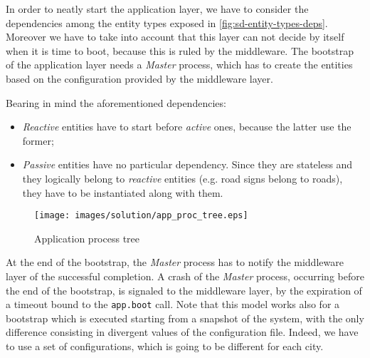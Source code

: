 In order to neatly start the application layer, we have to consider the 
dependencies among the entity types exposed in \ref{fig:sd-entity-types-deps}. 
Moreover we have to take into account that this layer can not decide by itself 
when it is time to boot, because this is ruled by the middleware.
The bootstrap of the application layer needs a \textit{Master} process,
which has to create the entities based on the configuration provided by 
the middleware layer.

Bearing in mind the aforementioned dependencies:
\begin{itemize}
  \item \textit{Reactive} entities have to start before \textit{active} 
ones, because the latter use the former; 
  \item \textit{Passive} entities have no particular dependency. Since 
they are stateless and they logically belong to \textit{reactive} entities 
(e.g. road signs belong to roads), they have to be instantiated along with them.
\end{itemize}

\begin{figure}[H]
  \centering
  \texttt{[image: images/solution/app\_proc\_tree.eps]}
  \caption{Application process tree}
  \label{fig:app-proc-tree}
\end{figure}

At the end of the bootstrap, the \textit{Master} process has to notify the 
middleware layer of the successful completion. A crash of the
\textit{Master} process, occurring before the end of the bootstrap, 
is signaled to the middleware layer, by the expiration of a timeout bound to
the \texttt{app.boot} call. 
Note that this model works also for a bootstrap which is executed starting 
from a snapshot of the system, with the only difference consisting in divergent
values of the configuration file. Indeed, we have to use a set of 
configurations, which is going to be different for each city.